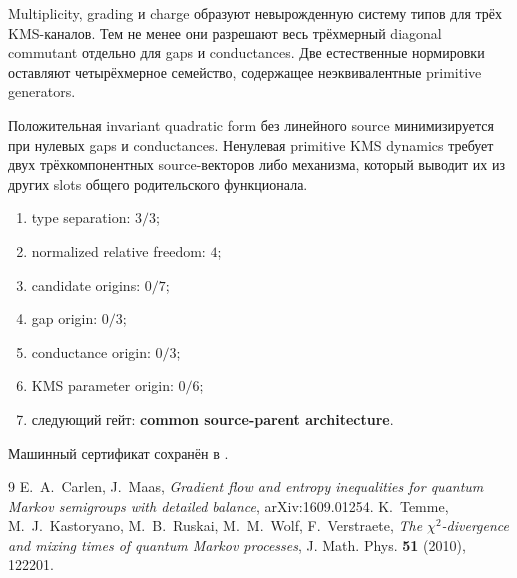 \begin{theorem}
Multiplicity, grading и charge образуют невырожденную систему типов для
трёх KMS-каналов. Тем не менее они разрешают весь трёхмерный diagonal
commutant отдельно для gaps и conductances. Две естественные нормировки
оставляют четырёхмерное семейство, содержащее неэквивалентные primitive
generators.
\end{theorem}

\begin{nogocriterion}
Положительная invariant quadratic form без линейного source минимизируется
при нулевых gaps и conductances. Ненулевая primitive KMS dynamics требует
двух трёхкомпонентных source-векторов либо механизма, который выводит их из
других slots общего родительского функционала.
\end{nogocriterion}

\begin{protocol}\begin{enumerate}
\item type separation: \textbf{$3/3$};
\item normalized relative freedom: \textbf{$4$};
\item candidate origins: \textbf{$0/7$};
\item gap origin: \textbf{$0/3$};
\item conductance origin: \textbf{$0/3$};
\item KMS parameter origin: \textbf{$0/6$};
\item следующий гейт: \textbf{common source-parent architecture}.
\end{enumerate}\end{protocol}

Машинный сертификат сохранён в
.

\begin{thebibliography}{9}
E.~A.~Carlen, J.~Maas, \emph{Gradient flow and entropy inequalities for
quantum Markov semigroups with detailed balance}, arXiv:1609.01254.
K.~Temme, M.~J.~Kastoryano, M.~B.~Ruskai, M.~M.~Wolf, F.~Verstraete,
\emph{The $\chi^2$-divergence and mixing times of quantum Markov processes},
J. Math. Phys. \textbf{51} (2010), 122201.
\end{thebibliography}